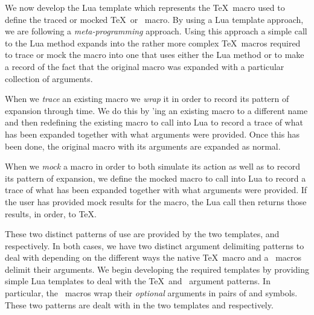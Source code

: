 \def\traceContextMacro#1#2{%
  \directlua{%
    thirddata.contests.createMacro('#1', #2, 'context', 'trace')
  }
}

\def\mockTexMacro#1#2{%
  \directlua{%
    thirddata.contests.createMacro('#1', #2, 'tex', 'mock')
  }
}

\def\mockContextMacro#1#2{%
  \directlua{%
    thirddata.contests.createMacro('#1', #2, 'context', 'mock')
  }
}
\stopMkIVCode

We now develop the Lua template which represents the \TeX\ macro used to 
define the traced or mocked \TeX\ or \ConTeXt\ macro. By using a Lua 
template approach, we are following a \emph{meta-programming} approach. 
Using this approach a simple call to the Lua method  
expands into the rather more complex \TeX\ macros required to trace or 
mock the macro into one that uses either the Lua method 
 or  to make a record of the 
fact that the original macro was expanded with a particular collection of 
arguments. 

When we \emph{trace} an existing macro we \emph{wrap} it in order to 
record its pattern of expansion through time. We do this by 
\type{\let}'ing an existing macro to a different name and then redefining 
the existing macro to call into Lua to record a trace of what has been 
expanded together with what arguments were provided. Once this has been 
done, the original macro with its arguments are expanded as normal. 

When we \emph{mock} a macro in order to both simulate its action as well 
as to record its pattern of expansion, we define the mocked macro to call 
into Lua to record a trace of what has been expanded together with what 
arguments were provided. If the user has provided mock results for the 
macro, the Lua call then returns those results, in order, to \TeX. 

These two distinct patterns of use are provided by the two templates, 
 and  respectively. In both cases, we have two 
distinct argument delimiting patterns to deal with depending on the 
different ways the  native \TeX\ macro and a 
 \ConTeXt\ macros delimit their arguments. We begin 
developing the required templates by providing simple Lua templates to 
deal with the \TeX\ and \ConTeXt\ argument patterns. In particular, the 
 \ConTeXt\ macros wrap their \emph{optional} arguments in 
pairs of \quote{[} and \quote{]} symbols. These two patterns are dealt 
with in the two templates  and 
 respectively. 

